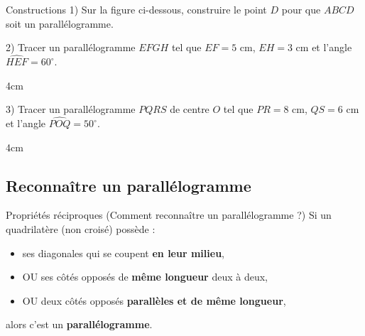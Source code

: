 \documentclass[a4paper]{book}
\begin{document}
    
    \begin{exerciceTitre}{Constructions}
        1) Sur la figure ci-dessous, construire le point $D$ pour que $ABCD$ soit un parallélogramme.
        \vspace{1cm}
        \begin{center}
        \end{center}
        
        2) Tracer un parallélogramme $EFGH$ tel que $EF = 5\text{ cm}$, $EH = 3\text{ cm}$ et l'angle $\widehat{HEF} = 60^{\circ}$.
        \begin{ZoneReponse}{4cm}
        \end{ZoneReponse}
    
        3) Tracer un parallélogramme $PQRS$ de centre $O$ tel que $PR = 8\text{ cm}$, $QS = 6\text{ cm}$ et l'angle $\widehat{POQ} = 50^{\circ}$.
        \begin{ZoneReponse}{4cm}
        \end{ZoneReponse}
    \end{exerciceTitre}


\newpage
\subsection{Reconnaître un parallélogramme}

    \begin{proprieteTitre}{Propriétés réciproques (Comment reconnaître un parallélogramme ?)}
    Si un quadrilatère (non croisé) possède :
    \begin{itemize}
        \item ses diagonales qui se coupent \textbf{en leur milieu},
        \item OU ses côtés opposés de \textbf{même longueur} deux à deux,
        \item OU deux côtés opposés \textbf{parallèles et de même longueur},
    \end{itemize}
    alors c'est un \textbf{parallélogramme}.
    \end{proprieteTitre}
\end{document}
